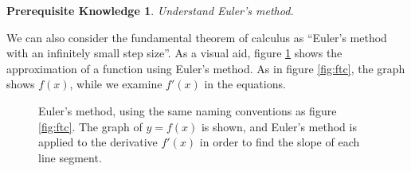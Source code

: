 \documentclass{myarticle}
\theoremstyle{nospace}
\newtheorem*{oldprereq}{Prerequisite Knowledge}
\newenvironment{prereq}{\begin{mdframed}\begin{oldprereq}}{\end{oldprereq}\end{mdframed}}
\newtheorem{old series theorem}{Theorem}
\newenvironment{series theorem}{\begin{mdframed}\begin{old series theorem}}{\end{old series theorem}\end{mdframed}}
\begin{document}
\begin{prereq} Understand Euler's method. \end{prereq}

We can also consider the fundamental theorem of calculus as ``Euler's method with an infinitely small step size''. As a visual aid, figure \ref{fig:euler's method} shows the approximation of a function using Euler's method. As in figure \ref{fig:ftc}, the graph shows $f(x)$, while we examine $f'(x)$ in the equations.

\begin{figure}[htb!] \centering
{}
\caption{Euler's method, using the same naming conventions as figure \ref{fig:ftc}. The graph of $y = f(x)$ is shown, and Euler's method is applied to the derivative $f'(x)$ in order to find the slope of each line segment.}
\label{fig:euler's method}
\end{figure}
\end{document}
